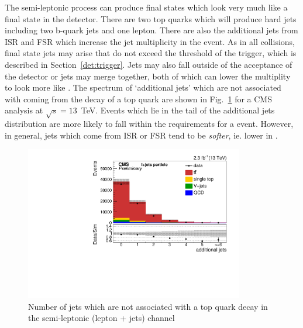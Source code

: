 The semi-leptonic \ttbar process can produce final states which look very much like a \tttt final state in the detector. There are two top quarks which will produce hard jets including two b-quark jets and one lepton. There are also the additional jets from ISR and FSR which increase the jet multiplicity in the event. As in all collisions, final state jets may arise that do not exceed the \pt threshold of the trigger, which is described in Section~\ref{det:trigger}. Jets may also fall outside of the acceptance of the detector or jets may merge together, both of which can lower the \tttt multiplity to look more like \ttbar. 
The spectrum of `additional jets' which are not associated with coming from the decay of a top quark are shown in Fig.~\ref{fig:ttbarAdd} for a CMS analysis at $\sqrt{s}=13$~TeV. Events which lie in the tail of the additional jets distribution are more likely to fall within the requirements for a \tttt event. However, in general, jets which come from ISR or FSR tend to be \emph{softer}, ie. lower in \pt.

\begin{figure}[ht!]
\begin{center}
    \includegraphics[width=0.85\textwidth]{images/Theory/ttbarAdd.pdf}
    \caption{Number of jets which are not associated with a top quark decay in the \ttbar semi-leptonic (lepton + jets) channel~\cite{CMS-PAS-TOP-16-008}}
    \label{fig:ttbarAdd}
\end{center}
\end{figure}

